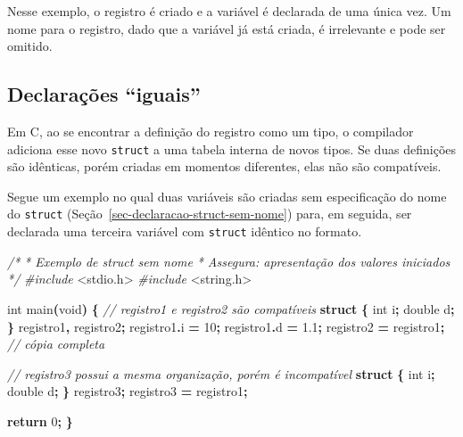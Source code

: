 \documentclass[
  11pt,
  a4paper,
]{scrbook}
\newenvironment{Shaded}{\begin{snugshade}}{\end{snugshade}}
\newcommand{\CommentTok}[1]{\textcolor[rgb]{0.56,0.35,0.01}{\textit{#1}}}
\newcommand{\ControlFlowTok}[1]{\textcolor[rgb]{0.13,0.29,0.53}{\textbf{#1}}}
\newcommand{\DataTypeTok}[1]{\textcolor[rgb]{0.13,0.29,0.53}{#1}}
\newcommand{\DecValTok}[1]{\textcolor[rgb]{0.00,0.00,0.81}{#1}}
\newcommand{\FloatTok}[1]{\textcolor[rgb]{0.00,0.00,0.81}{#1}}
\newcommand{\ImportTok}[1]{#1}
\newcommand{\KeywordTok}[1]{\textcolor[rgb]{0.13,0.29,0.53}{\textbf{#1}}}
\newcommand{\NormalTok}[1]{#1}
\newcommand{\OperatorTok}[1]{\textcolor[rgb]{0.81,0.36,0.00}{\textbf{#1}}}
\newcommand{\PreprocessorTok}[1]{\textcolor[rgb]{0.56,0.35,0.01}{\textit{#1}}}
\begin{document}
Nesse exemplo, o registro é criado e a variável é declarada de uma única
vez. Um nome para o registro, dado que a variável já está criada, é
irrelevante e pode ser omitido.

\subsection{Declarações ``iguais''}\label{sec-declaracoes-struct-iguais}

Em C, ao se encontrar a definição do registro como um tipo, o compilador
adiciona esse novo \texttt{struct} a uma tabela interna de novos tipos.
Se duas definições são idênticas, porém criadas em momentos diferentes,
elas não são compatíveis.

Segue um exemplo no qual duas variáveis são criadas sem especificação do
nome do \texttt{struct} (Seção~\ref{sec-declaracao-struct-sem-nome})
para, em seguida, ser declarada uma terceira variável com
\texttt{struct} idêntico no formato.

\begin{Shaded}
\begin{Highlighting}[]

\CommentTok{/*}
\CommentTok{ * Exemplo de struct sem nome}
\CommentTok{ * Assegura: apresentação dos valores iniciados}
\CommentTok{ */}
\PreprocessorTok{\#include }\ImportTok{\textless{}stdio.h\textgreater{}}
\PreprocessorTok{\#include }\ImportTok{\textless{}string.h\textgreater{}}

\DataTypeTok{int}\NormalTok{ main}\OperatorTok{(}\DataTypeTok{void}\OperatorTok{)} \OperatorTok{\{}
    \CommentTok{// registro1 e registro2 são compatíveis}
    \KeywordTok{struct} \OperatorTok{\{}
        \DataTypeTok{int}\NormalTok{ i}\OperatorTok{;}
        \DataTypeTok{double}\NormalTok{ d}\OperatorTok{;}
    \OperatorTok{\}}\NormalTok{ registro1}\OperatorTok{,}\NormalTok{ registro2}\OperatorTok{;}
\NormalTok{    registro1}\OperatorTok{.}\NormalTok{i }\OperatorTok{=} \DecValTok{10}\OperatorTok{;}
\NormalTok{    registro1}\OperatorTok{.}\NormalTok{d }\OperatorTok{=} \FloatTok{1.1}\OperatorTok{;}
\NormalTok{    registro2 }\OperatorTok{=}\NormalTok{ registro1}\OperatorTok{;}  \CommentTok{// cópia completa}

    \CommentTok{// registro3 possui a mesma organização, porém é incompatível}
    \KeywordTok{struct} \OperatorTok{\{}
        \DataTypeTok{int}\NormalTok{ i}\OperatorTok{;}
        \DataTypeTok{double}\NormalTok{ d}\OperatorTok{;}
    \OperatorTok{\}}\NormalTok{ registro3}\OperatorTok{;}
\NormalTok{    registro3 }\OperatorTok{=}\NormalTok{ registro1}\OperatorTok{;}

    \ControlFlowTok{return} \DecValTok{0}\OperatorTok{;}
\OperatorTok{\}}
\end{Highlighting}
\end{Shaded}
\end{document}
